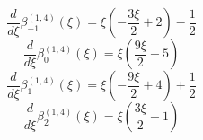 
\begin{equation}
\frac{d}{d\xi}\beta_{-1}^{(1,4)} (\xi) =
 \xi \left(- \frac{3 \xi}{2} + 2\right) - \frac{1}{2}
\end{equation}
\begin{equation}
\frac{d}{d\xi}\beta_{0}^{(1,4)} (\xi) =
 \xi \left(\frac{9 \xi}{2} - 5\right)
\end{equation}
\begin{equation}
\frac{d}{d\xi}\beta_{1}^{(1,4)} (\xi) =
 \xi \left(- \frac{9 \xi}{2} + 4\right) + \frac{1}{2}
\end{equation}
\begin{equation}
\frac{d}{d\xi}\beta_{2}^{(1,4)} (\xi) =
 \xi \left(\frac{3 \xi}{2} - 1\right)
\end{equation}
